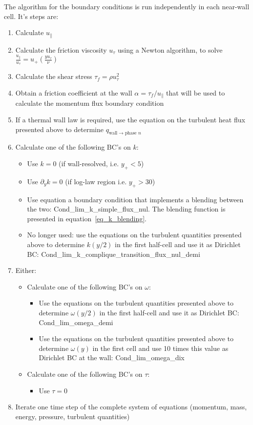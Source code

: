 The algorithm for the boundary conditions is run independently in each near-wall cell.
It's steps are:
\begin{enumerate}
	\item Calculate $u_\parallel$
	\item Calculate the friction viscosity $u_\tau$ using a Newton algorithm, to solve $\frac{u_\parallel}{u_\tau} = u_+(\frac{y u_\tau}{\nu})$
	\item Calculate the shear stress $\tau_f = \rho u_\tau^2$
	\item Obtain a friction coefficient at the wall $\alpha = \tau_f / u_\parallel$ that will be used to calculate the momentum flux boundary condition
	\item If a thermal wall law is required, use the equation on the turbulent heat flux presented above to determine $q_{\text{wall}\rightarrow\text{phase~}n}$
	\item Calculate one of the following BC's on $k$:
	\begin{itemize}
		\item Use $k=0$ (if wall-resolved, i.e. $y_+<5$)
		\item Use $\partial_y k=0$ (if log-law region i.e. $y_+>30$)
		\item Use equation a boundary condition that implements a blending between the two: Cond\_lim\_k\_simple\_flux\_nul. The blending function is presented in equation~\eqref{eq_k_blending}.
		\item No longer used: use the equations on the turbulent quantities presented above to determine $k(y/2)$ in the first half-cell and use it as Dirichlet BC: Cond\_lim\_k\_complique\_transition\_flux\_nul\_demi
	\end{itemize}
	\item Either:
	\begin{itemize}
		\item Calculate one of the following BC's on $\omega$:
		\begin{itemize}
			\item Use the equations on the turbulent quantities presented above to determine $\omega(y/2)$ in the first half-cell and use it as Dirichlet BC: Cond\_lim\_omega\_demi
			\item Use the equations on the turbulent quantities presented above to determine $\omega(y)$ in the first cell and use 10 times this value as Dirichlet BC at the wall: Cond\_lim\_omega\_dix
		\end{itemize}
		\item Calculate one of the following BC's on $\tau$:
		\begin{itemize}
			\item Use $\tau = 0$
		\end{itemize}
	\end{itemize}
	\item Iterate one time step of the complete system of equations (momentum, mass, energy, pressure, turbulent quantities)
\end{enumerate}

